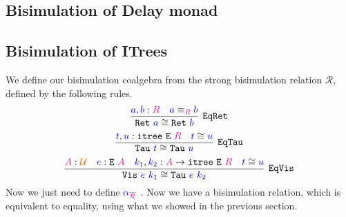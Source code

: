 \documentclass[twoside,11pt,openright]{report}
\newcommand*{\term}[1]{\textcolor{blue!80!black}{#1}}
\newcommand*{\type}[1]{\textcolor{magenta!90!black}{#1}}
\newcommand*{\universe}[1]{\textcolor{orange!80!black}{#1}}
\newcommand*{\typeformer}[1]{\ensuremath{\mathtt{#1}}}
\begin{document}
\subsection{Bisimulation of Delay monad}
\subsection{Bisimulation of ITrees}
We define our bisimulation coalgebra from the strong bisimulation relation \(\mathcal{R}\), defined by the following rules.
\begin{equation}
  \infer[\mathtt{EqRet}]{\mathtt{Ret}~\term{a} \cong \mathtt{Ret}~\term{b}}{\term{a},\term{b} : \type{R} & \term{a} \equiv_{\type{R}} \term{b}}
\end{equation}
\begin{equation}
  \infer[\mathtt{EqTau}]{\mathtt{Tau}~\term{t} \cong \mathtt{Tau}~\term{u}}{\term{t},\term{u} : \mathtt{itree}~\typeformer{E}~\type{R} & \term{t} \cong \term{u}}
\end{equation}
\begin{equation}
  \infer[\mathtt{EqVis}]{\mathtt{Vis}~\term{e}~\term{k_1} \cong \mathtt{Tau}~\term{e}~\term{k_2}}{\type{A} : \universe{\mathcal{U}} & \term{e} : \typeformer{E}~\type{A} & \term{k_1},\term{k_2} : \type{A} \rightarrow \mathtt{itree}~\typeformer{E}~\type{R} & \term{t} \cong \term{u}}
\end{equation}
Now we just need to define \(\term{\alpha}_{\type{\overline{\mathcal{R}}}}\) . Now we have a bisimulation relation, which is equivalent to equality, using what we showed in the previous section.
\end{document}
